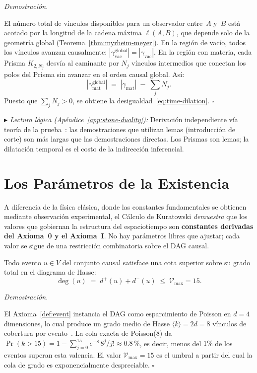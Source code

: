 \documentclass[11pt, a4paper, openany]{book}
\newcommand{\stoneref}[1]{%
  \smallskip\noindent
  {\small\color{structure!70}\textit{$\blacktriangleright$ Lectura
  l\'ogica (Ap\'endice~\ref{app:stone-duality}):} #1}%
  \smallskip}
\renewenvironment{proof}[1][Demostraci\'on]{%
  \par\noindent\textit{#1.}\quad
}{\hfill$\square$\par\medskip}
\begin{document}
\begin{proof}
El n\'umero total de v\'inculos disponibles para un observador
entre~$A$ y~$B$ est\'a acotado por la longitud de la cadena
m\'axima $\ell(A,B)$, que depende solo de la geometr\'ia global
(Teorema~\ref{thm:myrheim-meyer}). En la regi\'on de vac\'io, todos
los v\'inculos avanzan causalmente:
$|\gamma_{\text{vac}}^{\text{global}}| = |\gamma_{\text{vac}}|$.
En la regi\'on con materia, cada Prisma $K_{2,N_j}$ desv\'ia al
caminante por $N_j$ v\'inculos intermedios que conectan los polos del
Prisma sin avanzar en el orden causal global. As\'i:
\[
  |\gamma_{\text{mat}}^{\text{global}}|
  \;=\; |\gamma_{\text{mat}}|
  \;-\; \sum_j N_j.
\]
Puesto que $\sum_j N_j > 0$, se obtiene
la desigualdad~\eqref{eq:time-dilation}.
\end{proof}

\stoneref{Derivaci\'on independiente v\'ia teor\'ia de la
prueba~\cite{prawitz1965}: las demostraciones que utilizan lemas
(introducci\'on de corte) son m\'as largas que las demostraciones
directas. Los Prismas son lemas; la dilataci\'on temporal es el costo
de la indirecci\'on inferencial.}

\section{Los Par\'ametros de la Existencia}

A diferencia de la f\'isica cl\'asica, donde las constantes fundamentales
se obtienen mediante observaci\'on experimental, el C\'alculo de
Kuratowski \emph{demuestra} que los valores que gobiernan la estructura del
espaciotiempo son \textbf{constantes derivadas del Axioma~0 y el Axioma~I}.
No hay par\'ametros libres que ajustar; cada valor
se sigue de una restricci\'on combinatoria sobre el DAG causal.

\begin{theorem}[L\'imite de Valencia $\mathcal{V}_{\max} = 15$]
\label{thm:valence-limit}
Todo evento $u \in V$ del conjunto causal satisface una cota superior
sobre su grado total en el diagrama de Hasse:
\begin{equation}
  \deg(u) \;=\; d^+(u) + d^-(u) \;\leq\; \mathcal{V}_{\max} = 15.
  \label{eq:valence-limit}
\end{equation}
\end{theorem}

\begin{proof}
El Axioma~\ref{def:event} instancia el DAG como esparcimiento de
Poisson en $d = 4$ dimensiones, lo cual produce un grado medio de
Hasse $\langle k\rangle = 2d = 8$ v\'inculos de cobertura por
evento~\cite{bombelli1987,rideout2000}. La cola exacta de Poisson($8$)
da $\Pr(k > 15) = 1 - \sum_{j=0}^{15} e^{-8}\,8^j/j! \approx
0{.}8\,\%$, es decir, menos del $1\%$ de los eventos superan esta
valencia. El valor $\mathcal{V}_{\max} = 15$ es el umbral a partir
del cual la cola de grado es exponencialmente despreciable.
\end{proof}
\end{document}
